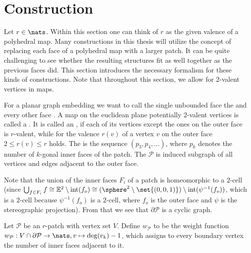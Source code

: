 \section{Construction}\label{sec:construction}

Let $r \in \nats$. Within this section one can think of $r$ as the given valence of a polyhedral map. Many constructions in this thesis will utilize the concept of replacing each face of a polyhedral map with a larger patch. It can be quite challenging to see whether the resulting structures fit as well together as the previous faces did. This section introduces the necessary formalism for these kinds of constructions. Note that throughout this section, we allow for $2$-valent vertices in maps.

\begin{definition}[Patch] For a planar graph embedding we want to call the single unbounded face the  and every other face . A map on the euclidean plane potentially $2$-valent vertices is called a . It is called an , if each of its vertices except the ones on the outer face is $r$-valent, while for the valence $r(v)$ of a vertex $v$ on the outer face $2 \leq r(v) \leq r$ holds. The  is the sequence $(p_3, p_4, \dots)$, where $p_k$ denotes the number of $k$-gonal inner faces of the patch. The  $\mathcal{P}$ is induced subgraph of all vertices and edges adjacent to the outer face.
\end{definition}

Note that the union of the inner faces $F_{i}$ of a patch is homeomorphic to a $2$-cell (since $\bigcup_{f \in F_{i}} f \cong \mathbb{E}^2 \setminus \operatorname{int}(f_{o}) \cong (\sphere^2 \setminus \set{(0, 0, 1)}) \setminus \operatorname{int}(\psi^{-1}(f_{o}))$, which is a $2$-cell because $\psi^{-1}(f_{o})$ is a $2$-cell, where $f_{o}$ is the outer face and $\psi$ is the stereographic projection). From that we see that $\partial\mathcal{P}$ is a cyclic graph.

\begin{definition} Let $\mathcal{P}$ be an $r$-patch with vertex set $V$. Define $w_{\mathcal{P}}$ to be the weight function $w_{\mathcal{P}} : V \cap \partial\mathcal{P} \to \nats, v \mapsto \deg(v_k) - 1$, which assigns to every boundary vertex the number of inner faces adjacent to it.
\end{definition}

